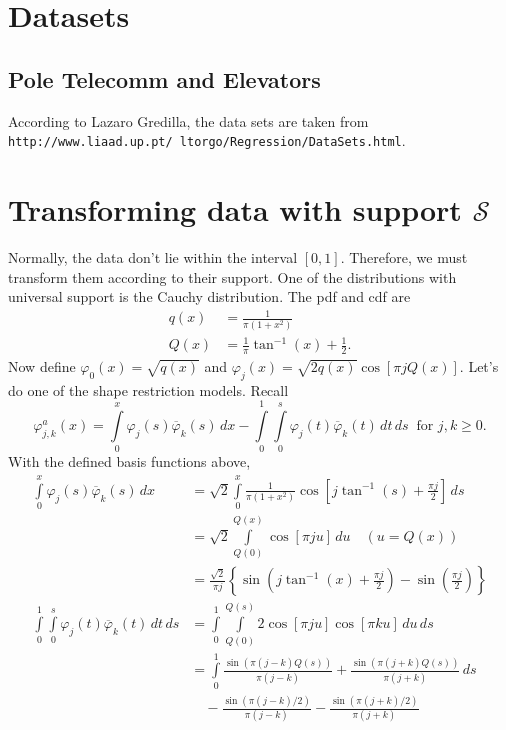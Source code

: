 \documentclass[11pt]{article}
\begin{document}
\section{Datasets}
\subsection{Pole Telecomm and Elevators}
  According to Lazaro Gredilla, the data sets are taken from \texttt{http://www.liaad.up.pt/~ltorgo/Regression/DataSets.html}. 
\section{Transforming data with support $\mathcal{S}$}
Normally, the data don't lie within the interval $\left[0,1\right]$. Therefore, we must transform them according to their support. One of the distributions with universal support is the Cauchy distribution. The pdf and cdf are
\begin{align}
  q\left(x\right) &= \frac{1}{\pi\left(1+x^{2}\right)}\\
  Q\left(x\right) &= \frac{1}{\pi}\tan^{-1}\left(x\right) + \frac{1}{2}.
\end{align}
Now define $\varphi_{0}\left(x\right) = \sqrt{q\left(x\right)}$ and $\varphi_{j}\left(x\right) = \sqrt{2q\left(x\right)}\cos\left[\pi jQ\left(x\right)\right]$. Let's do one of the shape restriction models. Recall
\begin{equation}
  \varphi_{j,k}^{a}\left(x\right) = \int\limits_{0}^{x}\varphi_{j}\left(s\right)\overline{\varphi}_{k}\left(s\right)\,dx - \int\limits_{0}^{1}\int\limits_{0}^{s}\varphi_{j}\left(t\right)\overline{\varphi}_{k}\left(t\right)\,dt\,ds\;\; \text{for $j, k \geq 0$}.
\end{equation}
With the defined basis functions above,
\begin{align}
  \int\limits_{0}^{x}\varphi_{j}\left(s\right)\overline{\varphi}_{k}\left(s\right)\,dx &= \sqrt{2}\int\limits_{0}^{x} \frac{1}{\pi\left(1+x^{2}\right)}\cos \left[j\tan^{-1}\left(s\right)+\frac{\pi j}{2}\right]\,ds\\
  &= \sqrt{2}\int\limits_{Q\left(0\right)}^{Q\left(x\right)}\cos\left[\pi ju\right]\,du\quad \left(u = Q\left(x\right)\right)\\
  &= \frac{\sqrt{2}}{\pi j}\left\{\sin\left(j\tan^{-1}\left(x\right) + \frac{\pi j}{2}\right) - \sin \left(\frac{\pi j}{2}\right) \right\}\\
  \int\limits_{0}^{1}\int\limits_{0}^{s} \varphi_{j}\left(t\right)\overline{\varphi}_{k}\left(t\right)\,dt\,ds &= \int\limits_{0}^{1}\int\limits_{Q\left(0\right)}^{Q\left(s\right)}2\cos\left[\pi ju\right]\cos\left[\pi ku\right]\,du\,ds \\
  &= \int\limits_{0}^{1}\frac{\sin\left(\pi\left(j-k\right)Q\left(s\right)\right)}{\pi\left(j-k\right)}+\frac{\sin\left(\pi\left(j+k\right)Q\left(s\right)\right)}{\pi\left(j+k\right)} \,ds\\
  &\quad - \frac{\sin\left(\pi\left(j-k\right)/2\right)}{\pi\left(j-k\right)}-\frac{\sin\left(\pi\left(j+k\right)/2\right)}{\pi\left(j+k\right)}
\end{align}
\end{document}
